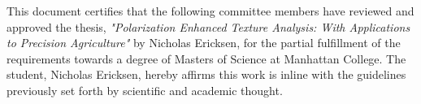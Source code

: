 
\begin{center}
  \begin{minipage}{0.80\textwidth}
        This document certifies that the following committee members have reviewed and approved the thesis, \textit{"Polarization Enhanced Texture Analysis: With Applications to Precision Agriculture"} by Nicholas Ericksen,
        for the partial fulfillment of the requirements towards a degree of Masters of Science at Manhattan College. The student, Nicholas Ericksen, hereby affirms this work is inline with the guidelines previously set forth by scientific and academic thought. \\
        \linebreak
        \hspace{25mm}
        \noindent {}
        \noindent {}
        \hspace{15mm}
        \noindent {}
        \noindent {}
  \end{minipage}
  \vspace{0.5cm}
\end{center}
